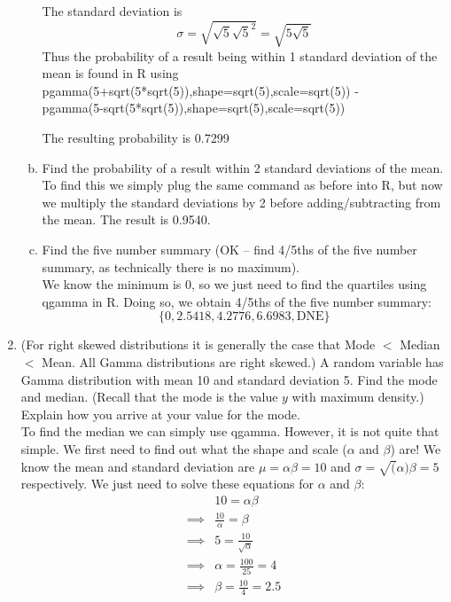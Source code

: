 \documentclass{scrartcl}
\begin{document}
\begin{enumerate}
\begin{enumerate}[a)]
    The standard deviation is $$\sigma = \sqrt{\sqrt{5}\sqrt{5}^2} = \sqrt{5\sqrt{5}}$$ Thus the probability of a result being within 1 standard deviation of the mean is found in R using \\pgamma(5+sqrt(5*sqrt(5)),shape=sqrt(5),scale=sqrt(5)) - \\pgamma(5-sqrt(5*sqrt(5)),shape=sqrt(5),scale=sqrt(5))

    The resulting probability is 0.7299\\

  \item Find the probability of a result within 2 standard deviations of the mean.\\

    To find this we simply plug the same command as before into R, but now we multiply the standard deviations by 2 before adding/subtracting from the mean. The result is 0.9540.\\

  \item Find the five number summary (OK – find 4/5ths of the five number summary, as technically there is no maximum).\\

    We know the minimum is 0, so we just need to find the quartiles using qgamma in R. Doing so, we obtain 4/5ths of the five number summary: $$\{0,2.5418,4.2776,6.6983,\text{DNE}\}$$


  \end{enumerate}


\item (For right skewed distributions it is generally the case that Mode $<$ Median $<$ Mean. All Gamma distributions are right skewed.) A random variable has Gamma distribution with mean 10 and standard deviation 5. Find the mode and median. (Recall that the mode is the value $y$ with maximum density.) Explain how you arrive at your value for the mode.\\

  To find the median we can simply use qgamma. However, it is not quite that simple. We first need to find out what the shape and scale ($\alpha$ and $\beta$) are! We know the mean and standard deviation are $\mu = \alpha\beta = 10$ and $\sigma=\sqrt(\alpha)\beta = 5$ respectively. We just need to solve these equations for $\alpha$ and $\beta$:
  \begin{align*}
    &10 = \alpha\beta\\
    \implies&\frac{10}{\alpha} = \beta\\
    \implies&5 = \frac{10}{\sqrt{\alpha}}\\
    \implies& \alpha = \frac{100}{25} = 4\\
    \implies& \beta = \frac{10}{4} = 2.5
  \end{align*}


\end{enumerate}
\end{document}
